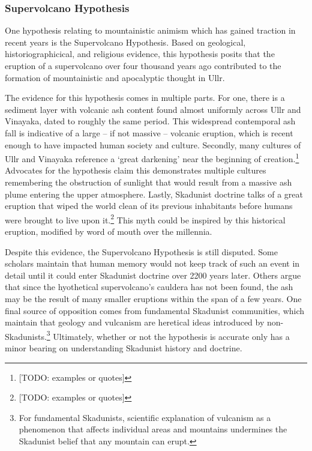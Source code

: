 \subsubsection{Supervolcano Hypothesis}

One hypothesis relating to mountainistic animism which has gained traction in recent years is the Supervolcano Hypothesis. Based on geological, historiographicical, and religious evidence, this hypothesis posits that the eruption of a supervolcano over four thousand years ago contributed to the formation of mountainistic and apocalyptic thought in Ullr. \par 

The evidence for this hypothesis comes in multiple parts. For one, there is a sediment layer with volcanic ash content found almost uniformly across Ullr and Vinayaka, dated to roughly the same period. This widespread contemporal ash fall is indicative of a large -- if not massive -- volcanic eruption, which is recent enough to have impacted human society and culture. Secondly, many cultures of Ullr and Vinayaka reference a `great darkening' near the beginning of creation.\footnote{[TODO: examples or quotes]} Advocates for the hypothesis claim this demonstrates multiple cultures remembering the obstruction of sunlight that would result from a massive ash plume entering the upper atmosphere. Lastly, Skadunist doctrine talks of a great eruption that wiped the world clean of its previous inhabitants before humans were brought to live upon it.\footnote{[TODO: examples or quotes]} This myth could be inspired by this historical eruption, modified by word of mouth over the millennia.\par 

Despite this evidence, the Supervolcano Hypothesis is still disputed. Some scholars maintain that human memory would not keep track of such an event in detail until it could enter Skadunist doctrine over 2200 years later. Others argue that since the hyothetical supervolcano's cauldera has not been found, the ash may be the result of many smaller eruptions within the span of a few years. One final source of opposition comes from fundamental Skadunist communities, which maintain that geology and vulcanism are heretical ideas introduced by non-Skadunists.\footnote{For fundamental Skadunists, scientific explanation of vulcanism as a phenomenon that affects individual areas and mountains undermines the Skadunist belief that any mountain can erupt.} Ultimately, whether or not the hypothesis is accurate only has a minor bearing on understanding Skadunist history and doctrine.

